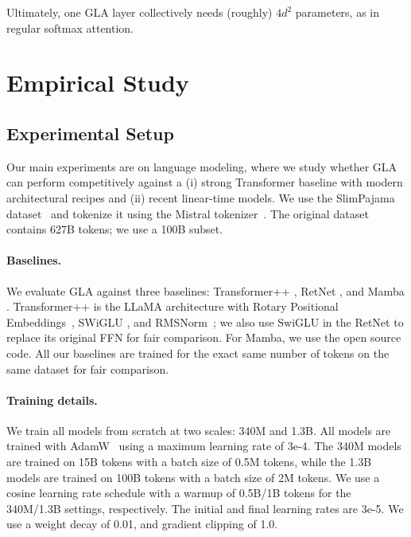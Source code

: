 Ultimately, one GLA layer collectively needs (roughly) $4d^2$ parameters, as in regular softmax attention. 

\section{Empirical Study}

\label{sec:experiments}

\subsection{Experimental Setup}

Our main experiments are on language modeling, where we study whether  GLA  can perform competitively against a (i) strong Transformer baseline with modern architectural recipes and (ii) recent linear-time models. We use the SlimPajama dataset~\citep{cerebras2023slimpajama} and tokenize it using the Mistral tokenizer~\citep{jiang2023mistral}. The original dataset contains 627B tokens; we use a 100B subset.

\paragraph{Baselines.} We evaluate  GLA  against three baselines: Transformer++ \citep{touvron2023llama}, RetNet \citep{sun2023retentive}, and Mamba \citep{Gu2023MambaLS}. Transformer++ is the LLaMA  architecture with Rotary Positional Embeddings~\citep{rope}, SWiGLU \citep{shazeer2020glu}, and RMSNorm~\citep{rmsnorm}; we also use SwiGLU in the RetNet to replace its original FFN for fair comparison. For Mamba, we use the open source code. All our baselines are trained for the exact same number of tokens on the same dataset for fair comparison.

\paragraph{Training details.} We train all models from scratch at two scales: 340M and 1.3B.  All models are trained with AdamW~\citep{loshchilov2018fixing} using a maximum learning rate of 3e-4. The 340M models are trained on 15B tokens with a batch size of 0.5M tokens, while the 1.3B models are trained on 100B tokens with a batch size of 2M tokens. We use a cosine learning rate schedule with a warmup of 0.5B/1B tokens for the 340M/1.3B settings, respectively. The initial and final learning rates are 3e-5. We use a weight decay of 0.01, and gradient clipping of 1.0.

